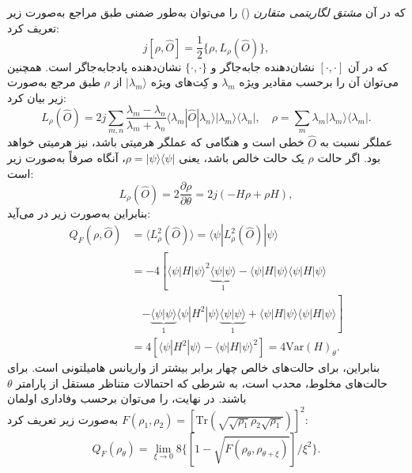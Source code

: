 که در آن \textit{مشتق لگاریتمی متقارن} () را می‌توان به‌طور ضمنی طبق مراجع \cite{21,22} به‌صورت زیر تعریف کرد:
\begin{equation}
	j[\rho, \hat{O}] = \frac{1}{2} \{ \rho, L_{\rho}(\hat{O}) \},
	\label{eq:11-47}
\end{equation}
که در آن $[\cdot, \cdot]$ نشان‌دهنده جابه‌جاگر و $\{\cdot, \cdot\}$ نشان‌دهنده پادجابه‌جاگر است. همچنین می‌توان آن را برحسب مقادیر ویژه $\lambda_m$ و کِت‌های ویژه $|\lambda_m\rangle$ از $\rho$ طبق مرجع \cite{23} به‌صورت زیر بیان کرد:
\begin{equation}
	L_{\rho}(\hat{O}) = 2j \sum_{m,n} \frac{\lambda_m - \lambda_n}{\lambda_m + \lambda_n} \langle \lambda_m | \hat{O} | \lambda_n \rangle |\lambda_m\rangle \langle \lambda_n |, \quad \rho = \sum_{m} \lambda_m |\lambda_m\rangle \langle \lambda_m |.
	\label{eq:11-48}
\end{equation}
عملگر  نسبت به $\hat{O}$ خطی است و هنگامی که عملگر هرمیتی باشد،  نیز هرمیتی خواهد بود. اگر حالت $\rho$ یک حالت خالص باشد، یعنی $\rho = |\psi\rangle \langle \psi|$، آنگاه  صرفاً به‌صورت زیر است:
\begin{equation}
	L_{\rho}(\hat{O}) = 2 \frac{\partial \rho}{\partial \theta} = 2j(-H\rho + \rho H),
	\label{eq:11-49}
\end{equation}
بنابراین  به‌صورت زیر در می‌آید:
\begin{equation}
	\begin{aligned}
		Q_F(\rho, \hat{O}) &= \langle L_{\rho}^2(\hat{O}) \rangle = \langle \psi | L_{\rho}^2(\hat{O}) | \psi \rangle \\
		&= -4 \left[ \langle \psi | H | \psi \rangle^2 \underbrace{\langle \psi | \psi \rangle}_{1} - \langle \psi | H | \psi \rangle \langle \psi | H | \psi \rangle \right. \\
		&\quad \left. - \underbrace{\langle \psi | \psi \rangle}_{1} \langle \psi | H^2 | \psi \rangle \underbrace{\langle \psi | \psi \rangle}_{1} + \langle \psi | H | \psi \rangle \langle \psi | H | \psi \rangle \right] \\
		&= 4 [ \langle \psi | H^2 | \psi \rangle - \langle \psi | H | \psi \rangle^2 ] = 4\text{Var}(H)_{\theta}.
		\label{eq:11-50}
	\end{aligned}
\end{equation}
بنابراین،  برای حالت‌های خالص چهار برابر بیشتر از واریانس هامیلتونی است. برای حالت‌های مخلوط،  محدب است، به شرطی که احتمالات متناظر مستقل از پارامتر $\theta$ باشند. در نهایت،  را می‌توان برحسب وفاداری اولمان $F(\rho_1, \rho_2) = [\text{Tr}(\sqrt{\sqrt{\rho_1} \rho_2 \sqrt{\rho_1}})]^2$ به‌صورت زیر تعریف کرد:
\begin{equation}
	Q_F(\rho_{\theta}) = \lim_{\xi \to 0} 8 \{ [ 1 - \sqrt{F(\rho_{\theta}, \rho_{\theta+\xi})} ] / \xi^2 \}.
	\label{eq:11-51}
\end{equation}

